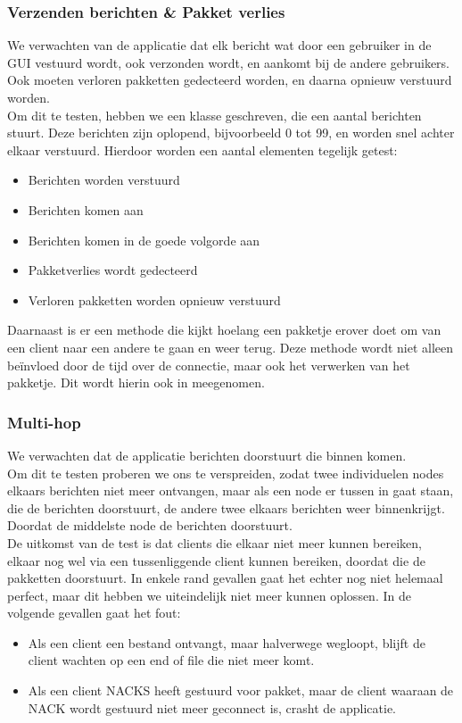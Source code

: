 \documentclass{article}
\begin{document}
\subsubsection{Verzenden berichten \& Pakket verlies}
We verwachten van de applicatie dat elk bericht wat door een gebruiker in de GUI vestuurd wordt, ook verzonden wordt, en aankomt bij de andere gebruikers. Ook moeten verloren pakketten gedecteerd worden, en daarna opnieuw verstuurd worden. \\
Om dit te testen, hebben we een klasse geschreven, die een aantal berichten stuurt. Deze berichten zijn oplopend, bijvoorbeeld 0 tot 99, en worden snel achter elkaar verstuurd. Hierdoor worden een aantal elementen tegelijk getest:
\begin{itemize}
\item Berichten worden verstuurd
\item Berichten komen aan
\item Berichten komen in de goede volgorde aan
\item Pakketverlies wordt gedecteerd
\item Verloren pakketten worden opnieuw verstuurd
\end{itemize}
Daarnaast is er een methode die kijkt hoelang een pakketje erover doet om van een client naar een andere te gaan en weer terug. Deze methode wordt niet alleen be\"{i}nvloed door de tijd over de connectie, maar ook het verwerken van het pakketje. Dit wordt hierin ook in meegenomen. 

\subsubsection{Multi-hop}
We verwachten dat de applicatie berichten doorstuurt die binnen komen. \\
Om dit te testen proberen we ons te verspreiden, zodat twee individuelen nodes elkaars berichten niet meer ontvangen, maar als een node er tussen in gaat staan, die de berichten doorstuurt, de andere twee elkaars berichten weer binnenkrijgt. Doordat de middelste node de berichten doorstuurt. \\
De uitkomst van de test is dat clients die elkaar niet meer kunnen bereiken, elkaar nog wel via een tussenliggende client kunnen bereiken, doordat die de pakketten doorstuurt. In enkele rand gevallen gaat het echter nog niet helemaal perfect, maar dit hebben we uiteindelijk niet meer kunnen oplossen. In de volgende gevallen gaat het fout: \\
\begin{itemize}
\item Als een client een bestand ontvangt, maar halverwege wegloopt, blijft de client wachten op een end of file die niet meer komt.
\item Als een client NACKS heeft gestuurd voor pakket, maar de client waaraan de NACK wordt gestuurd niet meer geconnect is, crasht de applicatie.
\end{itemize}
\end{document}

